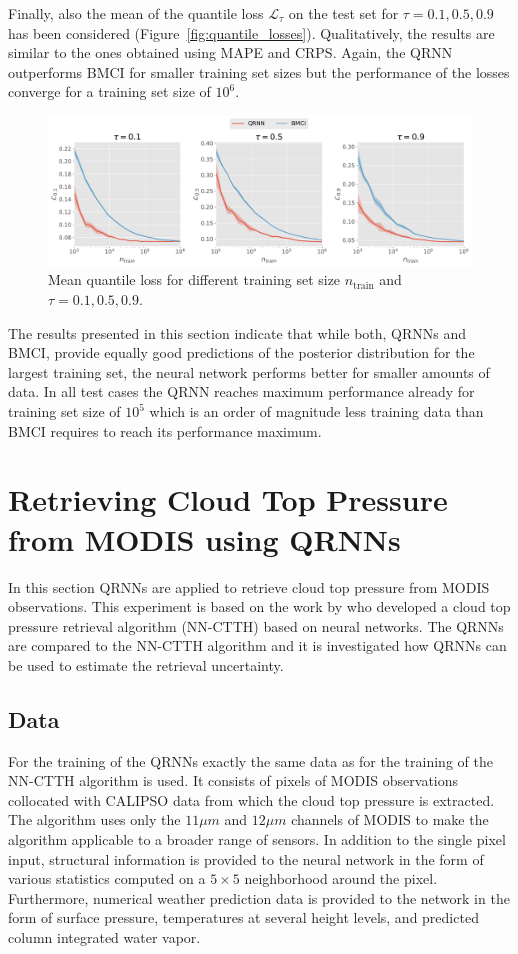 \documentclass[journal abbreviation, manuscript]{copernicus}
\begin{document}
Finally, also the mean of the quantile loss $\mathcal{L}_\tau$ on the test set
for $\tau = 0.1, 0.5, 0.9$ has been considered
(Figure~\ref{fig:quantile_losses}). Qualitatively, the results are similar to
the ones obtained using MAPE and CRPS. Again, the QRNN outperforms BMCI for
smaller training set sizes but the performance of the losses converge for
a training set size of $10^6$.

  \begin{figure}[hbpt!]
    \centering
    \includegraphics[width = 0.8\linewidth]{../plots/quantile_losses}
    \caption{Mean quantile loss for different training set size $n_\text{train}$ and
    $\tau = 0.1, 0.5, 0.9$.}
    \label{fig:mape_crps}
  \end{figure}

The results presented in this section indicate that while both, QRNNs and
BMCI, provide equally good predictions of the posterior distribution for the
largest training set, the neural network performs better for smaller amounts
of data. In all test cases the QRNN reaches maximum performance already for
training set size of $10^5$ which is an order of magnitude less training data
than BMCI requires to reach its performance maximum.

\section{Retrieving Cloud Top Pressure from MODIS using QRNNs}

In this section QRNNs are applied to retrieve cloud top pressure from MODIS
observations. This experiment is based on the work by \cite{hakansson} who
developed a cloud top pressure retrieval algorithm (NN-CTTH) based on neural
networks. The QRNNs are compared to the NN-CTTH algorithm and it is investigated
how QRNNs can be used to estimate the retrieval uncertainty.

\subsection{Data}

For the training of the QRNNs exactly the same data as for the training of the
NN-CTTH algorithm is used. It consists of pixels of MODIS observations collocated
with CALIPSO data from which the cloud top pressure is extracted. The algorithm
uses only the $11 \unit{\mu m}$ and $12\unit{\mu m}$ channels of MODIS to make the
algorithm applicable to a broader range of sensors. In addition to the single pixel
input, structural information is provided to the neural network in the form of various
statistics computed on a $5 \times 5$ neighborhood around the pixel. Furthermore,
numerical weather prediction data is provided to the network in the form
of surface pressure, temperatures at several height levels, and predicted column
integrated water vapor.
\end{document}
